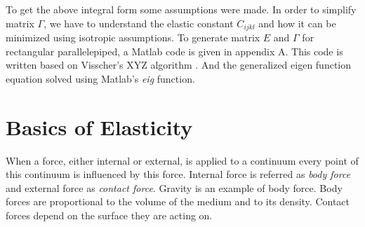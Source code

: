\begin{doublespacing}
To get the above integral form some assumptions were made. In order to simplify matrix $\Gamma$, we have to understand the elastic constant $C_{ijkl}$ and how it can be minimized using isotropic assumptions. To generate matrix $E$ and $\Gamma$ for rectangular parallelepiped, a Matlab code is given in appendix A. This code is written based on Visscher's XYZ algorithm \cite{visscher1991normal}. And the generalized eigen function equation solved using Matlab's \textit{eig} function.

\section{Basics of Elasticity}
When a force, either internal or external, is applied to a continuum every point of this continuum is influenced by this force. Internal force is referred as \textit{body force} and external force as \textit{contact force}. Gravity is an example of body force. Body forces are proportional to the volume of the medium and to its density. Contact forces depend on the surface they are acting on. 


\end{doublespacing}
